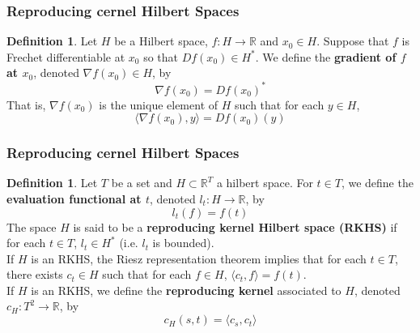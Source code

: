 \documentclass[notheorems]{beamer}
\theoremstyle{definition}
\newtheorem{defn}[definition]{Definition}
\newtheorem{fact}[definition]{Fact}
\newcommand{\R}{\mathbb{R}}
\renewcommand{\r}{\rangle}
\renewcommand{\l}{\langle}
\DeclareMathOperator*{\argmin}{arg\,min}
\begin{document}
\begin{frame}
\frametitle{Reproducing cernel Hilbert Spaces}

\begin{defn}
Let $H$ be a Hilbert space, $f: H \rightarrow \R$ and $x_0 \in H$. Suppose that $f$ is Frechet differentiable at $x_0$ so that $Df(x_0) \in H^*$. We define the \textbf{gradient of $f$ at $x_0$}, denoted $\nabla f(x_0) \in H$, by $$\nabla f(x_0) = Df(x_0)^*$$ That is, $\nabla f(x_0)$ is the unique element of $H$ such that for each $y \in H$, $$\l \nabla f(x_0), y \r = Df(x_0)(y)$$
\end{defn}


%
%
\end{frame}



















\begin{frame}

\frametitle{Reproducing cernel Hilbert Spaces}



\begin{defn}
Let $T$ be a set and $H \subset \R^T$ a hilbert space. For $t \in T$, we define the \textbf{evaluation functional at $t$}, denoted $l_t : H \rightarrow \R$, by $$l_t(f) = f(t)$$ 
\pause
The space $H$ is said to be a \textbf{reproducing kernel Hilbert space (RKHS)} if for each $t \in T$, $l_t \in H^*$ (i.e. $l_t$ is bounded). \\
\pause
If $H$ is an RKHS, the Riesz representation theorem implies that for each $t \in T$, there exists $c_t \in H$ such that for each $f \in H$, $\l c_t, f\r = f(t)$. \\
\pause
If $H$ is an RKHS, we define the \textbf{reproducing kernel} associated to $H$, denoted $c_H:T^2 \rightarrow \R$, by $$c_H(s,t) = \l c_s, c_t \r$$ 
\end{defn}
\end{frame}
\end{document}
